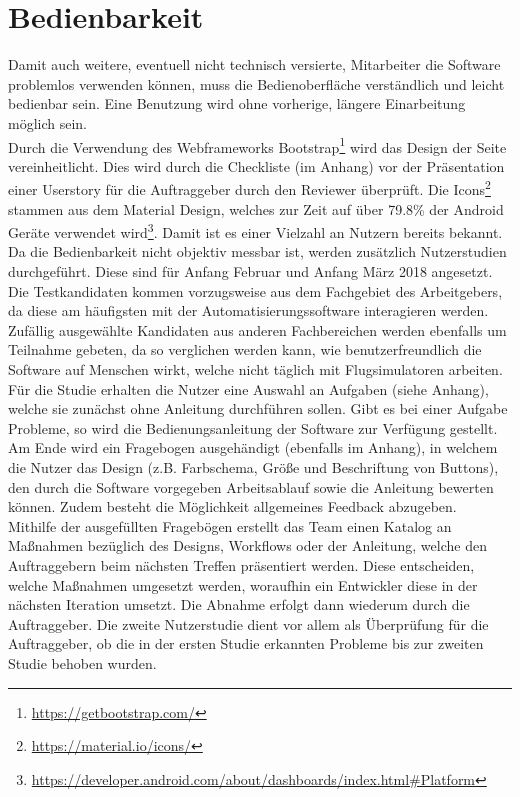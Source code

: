 \documentclass[accentcolor=tud9c,12pt,paper=a4]{tudreport}
\begin{document}
		\section{Bedienbarkeit}
		Damit auch weitere, eventuell nicht technisch versierte, Mitarbeiter die Software
		problemlos verwenden können, muss die 
		Bedienoberfläche verständlich und leicht bedienbar sein. Eine Benutzung wird ohne
		vorherige, längere Einarbeitung möglich sein.
		\\[5pt]
		Durch die Verwendung des Webframeworks Bootstrap\footnote{\url{https://getbootstrap.com/}}
		wird das Design der Seite vereinheitlicht. Dies wird durch die Checkliste (im Anhang)
		vor der Präsentation einer Userstory für die Auftraggeber durch den Reviewer überprüft. 
		Die Icons\footnote{\url{https://material.io/icons/}}
		stammen aus dem Material Design, welches zur Zeit auf über 79.8\% der Android Geräte
		verwendet wird\footnote{\url{https://developer.android.com/about/dashboards/index.html#Platform}}. 
		Damit ist es einer Vielzahl an Nutzern bereits bekannt.
		\\[5pt]
		Da die Bedienbarkeit nicht objektiv messbar ist, werden zusätzlich Nutzerstudien durchgeführt.
		Diese sind für Anfang Februar und Anfang März 2018 angesetzt.
		Die Testkandidaten kommen vorzugsweise aus dem
		Fachgebiet des Arbeitgebers, da diese am häufigsten mit der Automatisierungssoftware interagieren werden.
		Zufällig ausgewählte Kandidaten aus anderen Fachbereichen werden ebenfalls um Teilnahme gebeten, da
		so verglichen werden kann, wie benutzerfreundlich die Software auf Menschen wirkt, welche nicht täglich
		mit Flugsimulatoren arbeiten.
		\\[5pt]
		Für die Studie erhalten die Nutzer eine Auswahl an Aufgaben (siehe Anhang), 
		welche sie zunächst ohne Anleitung durchführen sollen. 
		Gibt es bei einer Aufgabe Probleme, so wird die Bedienungsanleitung 
		der Software zur Verfügung gestellt.
		Am Ende wird ein Fragebogen ausgehändigt (ebenfalls im Anhang),
		in welchem die Nutzer das Design (z.B. Farbschema, Größe und Beschriftung von Buttons), den
		durch die Software vorgegeben Arbeitsablauf sowie die Anleitung bewerten können. Zudem
		besteht die Möglichkeit allgemeines Feedback abzugeben.
		\\[5pt]
		Mithilfe der ausgefüllten Fragebögen erstellt das Team einen Katalog an
		Maßnahmen bezüglich des Designs, Workflows oder der Anleitung, 
		welche den Auftraggebern beim nächsten Treffen präsentiert werden. 
		Diese entscheiden, welche Maßnahmen umgesetzt werden, woraufhin ein
		Entwickler diese in der nächsten Iteration umsetzt. Die Abnahme erfolgt dann
		wiederum durch die Auftraggeber.
		Die zweite Nutzerstudie dient vor allem als Überprüfung für die Auftraggeber, ob die
		in der ersten Studie erkannten Probleme bis zur zweiten Studie behoben wurden.
\end{document}
